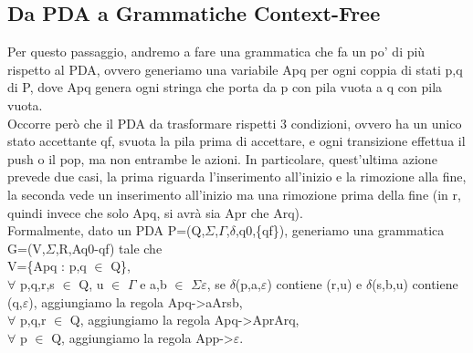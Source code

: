 \documentclass[]{article}
\begin{document}
		\subsection{Da PDA a Grammatiche Context-Free}
			Per questo passaggio, andremo a fare una grammatica che fa un po' di più rispetto al PDA, ovvero generiamo una variabile Apq per ogni coppia di stati p,q di P, dove Apq genera ogni stringa che porta da p con pila vuota a q con pila vuota.\\
			Occorre però che il PDA da trasformare rispetti 3 condizioni, ovvero ha un unico stato accettante qf, svuota la pila prima di accettare, e ogni transizione effettua il push o il pop, ma non entrambe le azioni. In particolare, quest'ultima azione prevede due casi, la prima riguarda l'inserimento all'inizio e la rimozione alla fine, la seconda vede un inserimento all'inizio ma una rimozione prima della fine (in r, quindi invece che solo Apq, si avrà sia Apr che Arq).\\
			Formalmente, dato un PDA P=(Q,$\Sigma$,$\Gamma$,$\delta$,q0,\{qf\}), generiamo una grammatica G=(V,$\Sigma$,R,Aq0-qf) tale che\\
			V=\{Apq : p,q $\in$ Q\},\\ 
			$\forall$ p,q,r,s $\in$ Q, u $\in$ $\Gamma$ e a,b $\in$ $\Sigma$$\varepsilon$, se $\delta$(p,a,$\varepsilon$) contiene (r,u) e $\delta$(s,b,u) contiene (q,$\varepsilon$), aggiungiamo la regola Apq-\textgreater aArsb, \\
			$\forall$ p,q,r $\in$ Q, aggiungiamo la regola Apq-\textgreater AprArq,\\
			$\forall$ p $\in$ Q, aggiungiamo la regola App-\textgreater $\varepsilon$.
\end{document}
